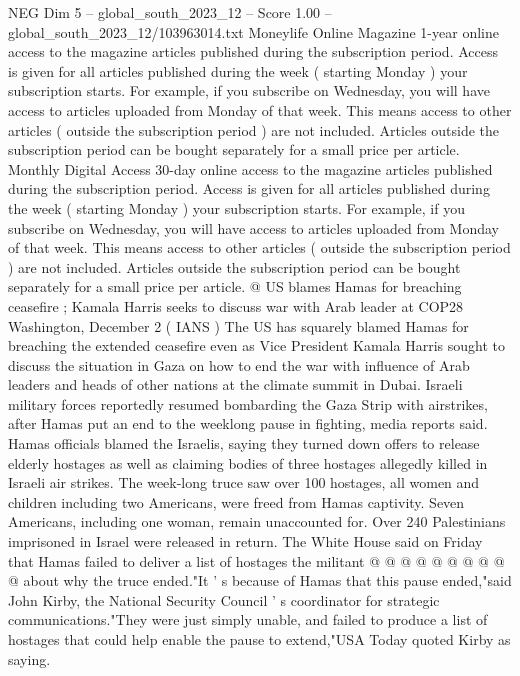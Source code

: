 \begin{textsample}{NEG Dim 5 – global\_south\_2023\_12 – Score 1.00 – global\_south\_2023\_12/103963014.txt}  \label{ex:f5_neg_355}
Moneylife Online Magazine 1-year online access to the magazine articles published during the subscription period.
Access is given for all articles published during the week ( starting Monday ) your subscription starts.
For example, if you subscribe on Wednesday, you will have access to articles uploaded from Monday of that week.
This means access to other articles ( outside the subscription period ) are not included.
Articles outside the subscription period can be bought separately for a small price per article.
Monthly Digital Access 30-day online access to the magazine articles published during the subscription period.
Access is given for all articles published during the week ( starting Monday ) your subscription starts.
For example, if you subscribe on Wednesday, you will have access to articles uploaded from Monday of that week.
This means access to other articles ( outside the subscription period ) are not included.
Articles outside the subscription period can be bought separately for a small price per article. @ US blames Hamas for breaching ceasefire ; Kamala Harris seeks to discuss war with Arab leader at COP28 Washington, December 2 ( IANS ) The US has squarely blamed Hamas for breaching the extended ceasefire even as Vice President Kamala Harris sought to discuss the situation in Gaza on how to end the war with influence of Arab leaders and heads of other nations at the climate summit in Dubai.
Israeli military forces reportedly resumed bombarding the Gaza Strip with airstrikes, after Hamas put an end to the weeklong pause in fighting, media reports said.
Hamas officials blamed the Israelis, saying they turned down offers to release elderly hostages as well as claiming bodies of three hostages allegedly killed in Israeli air strikes.
The week-long truce saw over 100 hostages, all women and children including two Americans, were freed from Hamas captivity.
Seven Americans, including one woman, remain unaccounted for.
Over 240 Palestinians imprisoned in Israel were released in return.
The White House said on Friday that Hamas failed to deliver a list of hostages the militant @ @ @ @ @ @ @ @ @ @ about why the truce ended."It ' s because of Hamas that this pause ended,"said John Kirby, the National Security Council ' s coordinator for strategic communications."They were just simply unable, and failed to produce a list of hostages that could help enable the pause to extend,"USA Today quoted Kirby as saying.

\end{textsample}
